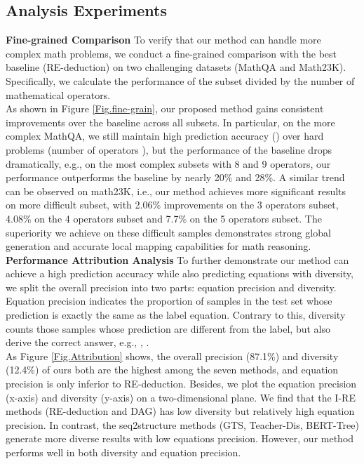 \documentclass[11pt]{article}
\begin{document}
\subsection{Analysis Experiments}\label{ana exp}
\textbf{Fine-grained Comparison} To verify that our method can handle more complex math problems, we conduct a fine-grained comparison with the best baseline (RE-deduction) on two challenging datasets (MathQA and Math23K). Specifically, we calculate the performance of the subset divided by the number of mathematical operators.\\ 
\indent As shown in Figure \ref{Fig.fine-grain}, our proposed method gains consistent improvements over the baseline across all subsets. In particular, on the more complex MathQA, we still maintain high prediction accuracy () over hard problems (number of operators  ), but the performance of the baseline drops dramatically, e.g., on the most complex subsets with 8 and 9 operators, our performance outperforms the baseline by nearly 20\% and 28\%. A similar trend can be observed on math23K, i.e., our method achieves more significant results on more difficult subset, with 2.06\% improvements on the 3 operators subset, 4.08\% on the 4 operators subset and 7.7\% on the 5 operators subset. The superiority we achieve on these difficult samples demonstrates strong global generation and accurate local mapping capabilities for math reasoning.\\ 
\indent \textbf{Performance Attribution Analysis} To further demonstrate our method can achieve a high prediction accuracy while also predicting equations with diversity, we split the overall precision into two parts: equation precision and diversity. Equation precision indicates the proportion of samples in the test set whose prediction is exactly the same as the label equation. Contrary to this, diversity counts those samples whose prediction are different from the label, but also derive the correct answer, e.g., , .\\ 
\indent As Figure \ref{Fig.Attribution} shows, the overall precision (87.1\%) and diversity (12.4\%) of ours both are the highest among the seven methods, and equation precision is only inferior to RE-deduction. Besides, we plot the equation precision (x-axis) and diversity (y-axis) on a two-dimensional plane. We find that the I-RE methods (RE-deduction and DAG) has low diversity but relatively high equation precision. In contrast, the seq2structure methods (GTS, Teacher-Dis, BERT-Tree) generate more diverse results with low equations precision. However, our method performs well in both diversity and equation precision.\\ 
\end{document}
